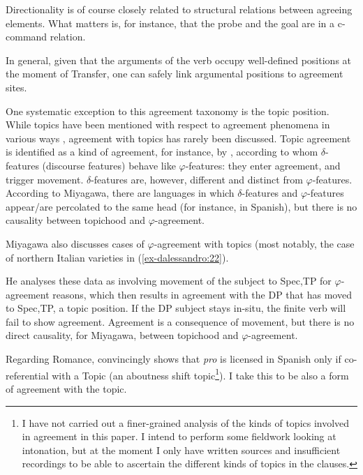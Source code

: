 \documentclass[output=paper
,modfonts
,nonflat]{langsci/langscibook}
\begin{document}
Directionality is of course closely related to structural relations between agreeing elements. What matters is, for instance, that the probe and the goal are in a c-command relation.

In general, given that the arguments of the verb occupy well-defined positions at the moment of Transfer, one can safely link argumental positions to agreement sites.

One systematic exception to this agreement taxonomy is the topic position. While topics have been mentioned with respect to agreement phenomena in various ways \citep{Bresnan_Mchombo1987, Lambrecht1981}, agreement with topics has rarely been discussed. Topic agreement is identified as a kind of agreement, for instance, by \citet{Miyagawa2017}, according to whom $\delta $-features (discourse features) behave like $\varphi $-features: they enter agreement, and trigger movement. $\delta $-features are, however, different and distinct from $\varphi $-features. According to Miyagawa, there are languages in which $\delta $-features and $\varphi $-features appear/are percolated to the same head (for instance, in Spanish), but there is no causality between topichood and $\varphi $-agreement. 

Miyagawa also discusses cases of $\varphi $-agreement with topics (most notably, the case of northern Italian varieties in (\ref{ex-dalessandro:22}).

He analyses these data as involving movement of the subject to Spec,TP for $\varphi $-agreement reasons, which then results in agreement with the DP that has moved to Spec,TP, a topic position. If the DP subject stays in-situ, the finite verb will fail to show agreement. Agreement is a consequence of movement, but there is no direct causality, for Miyagawa, between topichood and $\varphi $-agreement.

Regarding Romance, \citet{Jimenez_Fernandez2016} convincingly shows that \textit{pro} is licensed in Spanish only if co-referential with a Topic (an aboutness shift topic\footnote{
I have not carried out a finer-grained analysis of the kinds of topics involved in agreement in this paper. I intend to perform some fieldwork looking at intonation, but at the moment I only have written sources and insufficient recordings to be able to ascertain the different kinds of topics in the clauses.}). I take this to be also a form of agreement with the topic. 
\end{document}
